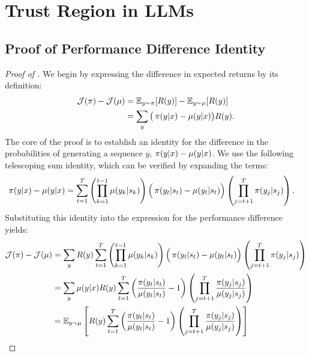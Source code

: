\section{Trust Region in LLMs}
\label{app:llm_tr_proof}

\subsection{Proof of Performance Difference Identity}

\begin{proof}[Proof of ]  
We begin by expressing the difference in expected returns by its definition:  
\begin{align*}  
\mathcal{J}(\operatorname*{{\textcolor{black}{\pi}}}) - \mathcal{J}(\operatorname*{{\textcolor{black}{\mu}}}) 
&= \mathbb{E}_{y \sim \operatorname*{{\textcolor{black}{\pi}}}}[R(y)] - \mathbb{E}_{y \sim \operatorname*{{\textcolor{black}{\mu}}}}[R(y)] \\
&= \sum_{y} \big( \operatorname*{{\textcolor{black}{\pi}}}(y|x) - \operatorname*{{\textcolor{black}{\mu}}}(y|x) \big) R(y).
\end{align*}  
The core of the proof is to establish an identity for the difference in the probabilities of generating a sequence $y$, $\operatorname*{{\textcolor{black}{\pi}}}(y|x) - \operatorname*{{\textcolor{black}{\mu}}}(y|x)$. We use the following telescoping sum identity, which can be verified by expanding the terms:  
\begin{align*}  
\operatorname*{{\textcolor{black}{\pi}}}(y|x) - \operatorname*{{\textcolor{black}{\mu}}}(y|x) &= \sum_{t=1}^{T} \left( \prod_{k=1}^{t-1} \operatorname*{{\textcolor{black}{\mu}}}(y_k|s_k) \right) \Big( \operatorname*{{\textcolor{black}{\pi}}}(y_t|s_t) - \operatorname*{{\textcolor{black}{\mu}}}(y_t|s_t) \Big) \left( \prod_{j=t+1}^{T} \operatorname*{{\textcolor{black}{\pi}}}(y_j|s_j) \right).
\end{align*}  
Substituting this identity into the expression for the performance difference yields:  
\begin{align*}  
\mathcal{J}(\trainerpi) - \mathcal{J}(\rolloutpi) &= \sum_{y} R(y) \sum_{t=1}^{T}  \left( \prod_{k=1}^{t-1} \rolloutpi(y_k|s_k) \right) \Big( \trainerpi(y_t|s_t) - \rolloutpi(y_t|s_t) \Big) \left( \prod_{j=t+1}^{T} \trainerpi(y_j|s_j) \right) \\  
&= \sum_{y} \rolloutpi(y|x) R(y) \sum_{t=1}^{T} \left( \frac{\trainerpi(y_t|s_t)}{\rolloutpi(y_t|s_t)} - 1 \right) \left( \prod_{j=t+1}^{T} \frac{\trainerpi(y_j|s_j)}{\rolloutpi(y_j|s_j)} \right) \\ 
&= \mathbb{E}_{y \sim \rolloutpi} \left[ R(y) \sum_{t=1}^{T} \left( \frac{\trainerpi(y_t|s_t)}{\rolloutpi(y_t|s_t)} - 1 \right) \left( \prod_{j=t+1}^{T} \frac{\trainerpi(y_j|s_j)}{\rolloutpi(y_j|s_j)} \right)  \right] \\

\end{align*}
\end{proof}
